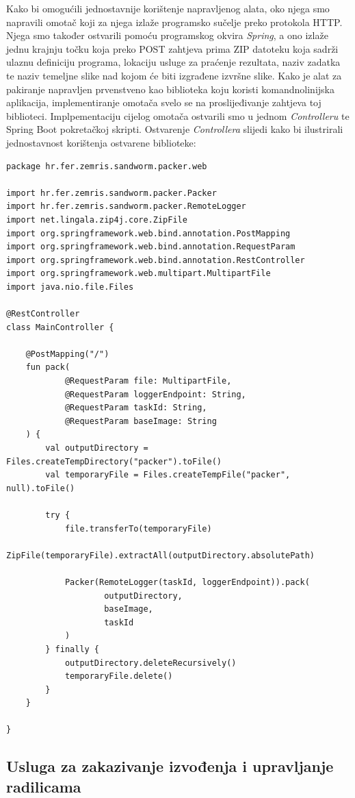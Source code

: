 \documentclass[times, utf8, zavrsni]{fer}
\begin{document}
{Kako bi omogućili jednostavnije korištenje napravljenog alata, oko njega smo napravili omotač koji za njega izlaže programsko sučelje preko protokola HTTP. Njega smo također ostvarili pomoću programskog okvira {\textit{Spring}}, a ono izlaže jednu krajnju točku koja preko POST zahtjeva prima ZIP datoteku koja sadrži ulaznu definiciju programa, lokaciju usluge za praćenje rezultata, naziv zadatka te naziv temeljne slike nad kojom će biti izgrađene izvršne slike. Kako je alat za pakiranje napravljen prvenstveno kao biblioteka koju koristi komandnolinijska aplikacija, implementiranje omotača svelo se na proslijeđivanje zahtjeva toj biblioteci. Implpementaciju cijelog omotača ostvarili smo u jednom {\textit{Controlleru}} te Spring Boot pokretačkoj skripti. Ostvarenje {\textit{Controllera}} slijedi kako bi ilustrirali jednostavnost korištenja ostvarene biblioteke:

\begin{lstlisting}
package hr.fer.zemris.sandworm.packer.web

import hr.fer.zemris.sandworm.packer.Packer
import hr.fer.zemris.sandworm.packer.RemoteLogger
import net.lingala.zip4j.core.ZipFile
import org.springframework.web.bind.annotation.PostMapping
import org.springframework.web.bind.annotation.RequestParam
import org.springframework.web.bind.annotation.RestController
import org.springframework.web.multipart.MultipartFile
import java.nio.file.Files

@RestController
class MainController {

    @PostMapping("/")
    fun pack(
            @RequestParam file: MultipartFile,
            @RequestParam loggerEndpoint: String,
            @RequestParam taskId: String,
            @RequestParam baseImage: String
    ) {
        val outputDirectory = Files.createTempDirectory("packer").toFile()
        val temporaryFile = Files.createTempFile("packer", null).toFile()

        try {
            file.transferTo(temporaryFile)
            ZipFile(temporaryFile).extractAll(outputDirectory.absolutePath)

            Packer(RemoteLogger(taskId, loggerEndpoint)).pack(
                    outputDirectory,
                    baseImage,
                    taskId
            )
        } finally {
            outputDirectory.deleteRecursively()
            temporaryFile.delete()
        }
    }

}
\end{lstlisting}

\subsection{Usluga za zakazivanje izvođenja i upravljanje radilicama}

}
\end{document}
